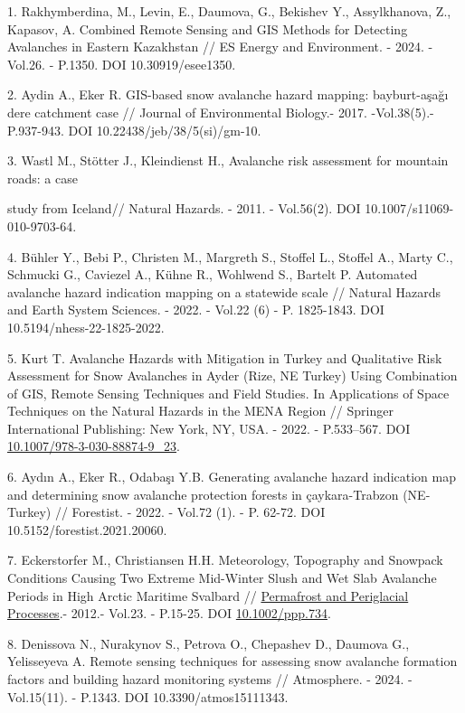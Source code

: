 \begin{references}
1. Rakhymberdina, M., Levin, E., Daumova, G., Bekishev Y., Assylkhanova,
Z., Kapasov, A. Combined Remote Sensing and GIS Methods for Detecting
Avalanches in Eastern Kazakhstan // ES Energy and Environment. - 2024. -
Vol.26. - P.1350. DOI 10.30919/esee1350.

2. Aydin A., Eker R. GIS-based snow avalanche hazard mapping:
bayburt-aşağı dere catchment case // Journal of Environmental Biology.-
2017. -Vol.38(5).- P.937-943. DOI 10.22438/jeb/38/5(si)/gm-10.

3. Wastl M., Stötter J., Kleindienst H., Avalanche risk assessment for
mountain roads: a case

study from Iceland// Natural Hazards. - 2011. - Vol.56(2). DOI
10.1007/s11069-010-9703-64.

4. Bühler Y., Bebi P., Christen M., Margreth S., Stoffel L., Stoffel A.,
Marty C., Schmucki G., Caviezel A., Kühne R., Wohlwend S., Bartelt P.
Automated avalanche hazard indication mapping on a statewide scale //
Natural Hazards and Earth System Sciences. - 2022. - Vol.22 (6) - P.
1825-1843. DOI 10.5194/nhess-22-1825-2022.

5. Kurt T. Avalanche Hazards with Mitigation in Turkey and Qualitative
Risk Assessment for Snow Avalanches in Ayder (Rize, NE Turkey) Using
Combination of GIS, Remote Sensing Techniques and Field Studies. In
Applications of Space Techniques on the Natural Hazards in the MENA
Region // Springer International Publishing: New York, NY, USA. - 2022.
- P.533--567. DOI
\href{http://dx.doi.org/10.1007/978-3-030-88874-9_23}{10.1007/978-3-030-88874-9\_23}.

6. Aydın A., Eker R., Odabaşı Y.B. Generating avalanche hazard
indication map and determining snow avalanche protection forests in
çaykara-Trabzon (NE-Turkey) // Forestist. - 2022. - Vol.72 (1). - P.
62-72. DOI 10.5152/forestist.2021.20060.

7. Eckerstorfer M., Christiansen H.H. Meteorology, Topography and
Snowpack Conditions Causing Two Extreme Mid-Winter Slush and Wet Slab
Avalanche Periods in High Arctic Maritime Svalbard //
\href{https://www.researchgate.net/journal/Permafrost-and-Periglacial-Processes-1099-1530?_tp=eyJjb250ZXh0Ijp7ImZpcnN0UGFnZSI6InB1YmxpY2F0aW9uIiwicGFnZSI6InB1YmxpY2F0aW9uIn19}{Permafrost
and Periglacial Processes}.- 2012.- Vol.23. - P.15-25. DOI
\href{http://dx.doi.org/10.1002/ppp.734}{10.1002/ppp.734}.

8. Denissova N., Nurakynov S., Petrova O., Chepashev D., Daumova G.,
Yelisseyeva A. Remote sensing techniques for assessing snow avalanche
formation factors and building hazard monitoring systems // Atmosphere.
- 2024. - Vol.15(11). - P.1343. DOI 10.3390/atmos15111343.


\end{references}
